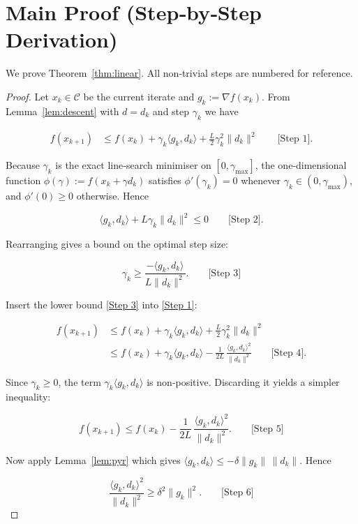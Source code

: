 \documentclass{article}
\newcommand{\C}{\mathcal{C}}
\begin{document}
\section*{Main Proof (Step‑by‑Step Derivation)}
We prove Theorem~\ref{thm:linear}.  
All non‑trivial steps are numbered for reference.

\begin{proof}
Let $x_{k}\in\C$ be the current iterate and $g_{k}:=\nabla f(x_{k})$.
From Lemma~\ref{lem:descent} with $d=d_{k}$ and step $\gamma_{k}$ we have

\[
\begin{aligned}
f(x_{k+1}) &\le f(x_{k})+\gamma_{k}\langle g_{k},d_{k}\rangle
            +\frac{L}{2}\gamma_{k}^{2}\|d_{k}\|^{2} \qquad\text{[Step 1]}.
\end{aligned}
\]

Because $\gamma_{k}$ is the exact line‑search minimiser on $[0,\gamma_{\max}]$,
the one‑dimensional function 
$\phi(\gamma):=f(x_{k}+\gamma d_{k})$ satisfies
$\phi'(\gamma_{k})=0$ whenever $\gamma_{k}\in(0,\gamma_{\max})$, and 
$\phi'(0)\ge0$ otherwise. Hence

\[
\langle g_{k},d_{k}\rangle+\!L\gamma_{k}\|d_{k}\|^{2}\le0
\qquad\text{[Step 2]}.
\]

Rearranging gives a bound on the optimal step size:

\[
\gamma_{k}\ge
\frac{-\langle g_{k},d_{k}\rangle}{L\|d_{k}\|^{2}} .
\qquad\text{[Step 3]}
\]

Insert the lower bound \eqref{Step 3} into \eqref{Step 1}:

\[
\begin{aligned}
f(x_{k+1}) 
&\le f(x_{k})+\gamma_{k}\langle g_{k},d_{k}\rangle
      +\frac{L}{2}\gamma_{k}^{2}\|d_{k}\|^{2}  \\
&\le f(x_{k})+\gamma_{k}\langle g_{k},d_{k}\rangle
      -\frac{1}{2L}\,\frac{\langle g_{k},d_{k}\rangle^{2}}{\|d_{k}\|^{2}}
      \qquad\text{[Step 4]} .
\end{aligned}
\]

Since $\gamma_{k}\ge0$, the term $\gamma_{k}\langle g_{k},d_{k}\rangle$ is non‑positive.
Discarding it yields a simpler inequality:

\[
f(x_{k+1})\le f(x_{k})-\frac{1}{2L}\,
\frac{\langle g_{k},d_{k}\rangle^{2}}{\|d_{k}\|^{2}} .
\qquad\text{[Step 5]}
\]

Now apply Lemma~\ref{lem:pyr} which gives
$\langle g_{k},d_{k}\rangle\le -\delta\|g_{k}\|\,\|d_{k}\|$.
Hence

\[
\frac{\langle g_{k},d_{k}\rangle^{2}}{\|d_{k}\|^{2}}
\ge \delta^{2}\|g_{k}\|^{2}.
\qquad\text{[Step 6]}
\]


\end{proof}
\end{document}
